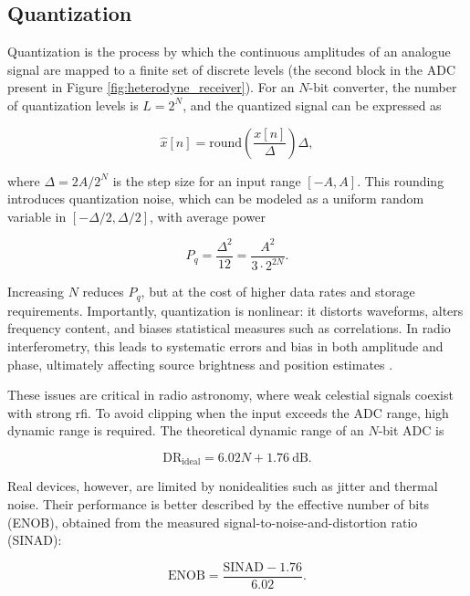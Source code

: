 \subsection{Quantization}
\label{sec:quantization}
Quantization is the process by which the continuous amplitudes of an analogue signal are mapped to a finite set of discrete levels (the second block in the ADC present in Figure \ref{fig:heterodyne_receiver}). For an $N$-bit converter, the number of quantization levels is $L = 2^N$, and the quantized signal can be expressed as

\begin{equation}
	\hat{x}[n] = \text{round}\!\left(\frac{x[n]}{\Delta}\right)\Delta,
\end{equation}

where $\Delta = 2A / 2^N$ is the step size for an input range $[-A, A]$. This rounding introduces quantization noise, which can be modeled as a uniform random variable in $[-\Delta/2, \Delta/2]$, with average power

\begin{equation}
	P_q = \frac{\Delta^2}{12} = \frac{A^2}{3 \cdot 2^{2N}}.
\end{equation}

Increasing $N$ reduces $P_q$, but at the cost of higher data rates and storage requirements. Importantly, quantization is nonlinear: it distorts waveforms, alters frequency content, and biases statistical measures such as correlations. In radio interferometry, this leads to systematic errors and bias in both amplitude and phase, ultimately affecting source brightness and position estimates \citep{menaparra2018quantizationbiasdigitalcorrelators}.  

These issues are critical in radio astronomy, where weak celestial signals coexist with strong \gls{rfi}. To avoid clipping when the input exceeds the ADC range, high dynamic range is required. The theoretical dynamic range of an $N$-bit ADC is

\begin{equation}
	\text{DR}_{\text{ideal}} = 6.02N + 1.76 \ \text{dB}.
\end{equation}

Real devices, however, are limited by nonidealities such as jitter and thermal noise. Their performance is better described by the effective number of bits (ENOB), obtained from the measured signal-to-noise-and-distortion ratio (SINAD):

\begin{equation}
	\text{ENOB} = \frac{\text{SINAD} - 1.76}{6.02}.
\end{equation}

